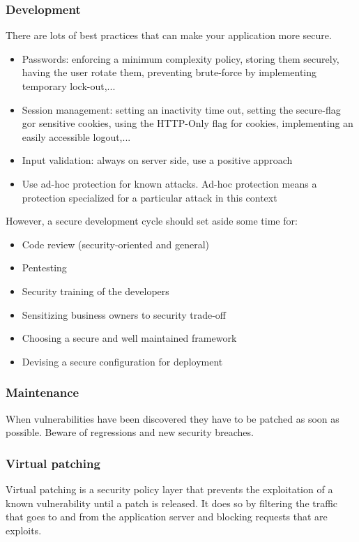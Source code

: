 \subsubsection{Development}
There are lots of best practices that can make your application more secure.
\begin{itemize}
\item Passwords: enforcing a minimum complexity policy, storing them securely,
having the user rotate them, preventing brute-force by implementing temporary
lock-out,...
\item Session management: setting an inactivity time out, setting the
secure-flag gor sensitive cookies, using the HTTP-Only flag for cookies,
implementing an easily accessible logout,...
\item Input validation: always on server side, use a positive approach
\item Use ad-hoc protection for known attacks. Ad-hoc protection means a
protection specialized for a particular attack in this context
\end{itemize}

However, a secure development cycle should set aside some time for:
\begin{itemize}
\item Code review (security-oriented and general)
\item Pentesting
\item Security training of the developers
\item Sensitizing business owners to security trade-off
\item Choosing a secure and well maintained framework
\item Devising a secure configuration for deployment
\end{itemize}

\subsubsection{Maintenance}
When vulnerabilities have been discovered they have to be patched as soon as
possible. Beware of regressions and new security breaches.

\subsubsection*{Virtual patching}
Virtual patching is a security policy layer that prevents the exploitation of
a known vulnerability until a patch is released.
It does so by filtering the traffic that goes to and from the application
server and blocking requests that are exploits.

